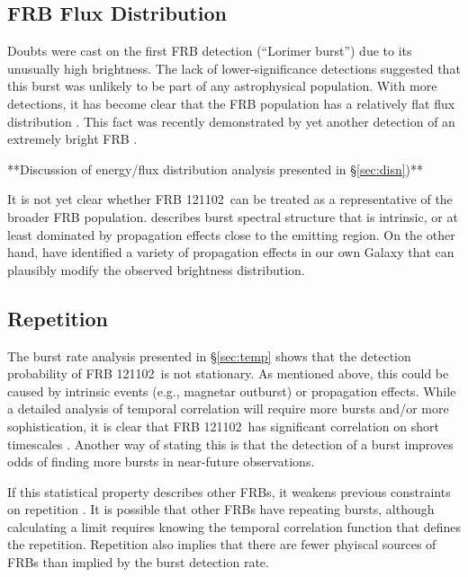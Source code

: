 \documentclass[twocolumn]{aastex61}
\newcommand{\frb}{FRB 121102}
\begin{document}
\subsection{FRB Flux Distribution}
Doubts were cast on the first FRB detection (``Lorimer burst'') due to its unusually high brightness. The lack of lower-significance detections suggested that this burst was unlikely to be part of any astrophysical population. With more detections, it has become clear that the FRB population has a relatively flat flux distribution \citep{2016ApJ...830...75V, 2016arXiv160206099L, 2016arXiv161100458L}. This fact was recently demonstrated by yet another detection of an extremely bright FRB \citep{2016arXiv161105758R}.

**Discussion of energy/flux distribution analysis presented in \S \ref{sec:disn})**

It is not yet clear whether \frb\ can be treated as a representative of the broader FRB population. \citet{2016Natur.531..202S} describes burst spectral structure that is intrinsic, or at least dominated by propagation effects close to the emitting region. On the other hand, \citep{CORDES} have identified a variety of propagation effects in our own Galaxy that can plausibly modify the observed brightness distribution.

\subsection{Repetition}
The burst rate analysis presented in \S \ref{sec:temp} shows that the detection probability of \frb\ is not stationary. As mentioned above, this could be caused by intrinsic events (e.g., magnetar outburst) or propagation effects. While a detailed analysis of temporal correlation will require more bursts and/or more sophistication, it is clear that \frb\ has significant correlation on short timescales \citep[sometimes called a ''red spectrum'';][]{2016MNRAS.458L..89C}. Another way of stating this is that the detection of a burst improves odds of finding more bursts in near-future observations. 

If this statistical property describes other FRBs, it weakens previous constraints on repetition \citep{2015MNRAS.454..457P,2015ApJ...807...16L}. It is possible that other FRBs have repeating bursts, although calculating a limit requires knowing the temporal correlation function that defines the repetition.  Repetition also implies that there are fewer phyiscal sources of FRBs than implied by the burst detection rate.
\end{document}
